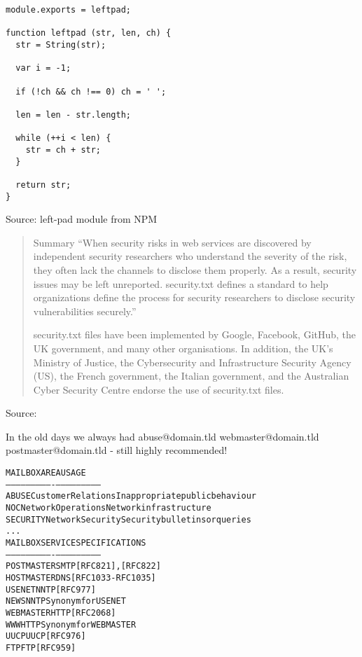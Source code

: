 \documentclass[Screen16to9,17pt]{foils}
\begin{document}


\begin{verbatim}
module.exports = leftpad;

function leftpad (str, len, ch) {
  str = String(str);

  var i = -1;

  if (!ch && ch !== 0) ch = ' ';

  len = len - str.length;

  while (++i < len) {
    str = ch + str;
  }

  return str;
}
\end{verbatim}
Source: left-pad module from NPM




\begin{quote}
Summary
“When security risks in web services are discovered by independent security researchers who understand the severity of the risk, they often lack the channels to disclose them properly. As a result, security issues may be left unreported. security.txt defines a standard to help organizations define the process for security researchers to disclose security vulnerabilities securely.”

security.txt files have been implemented by Google, Facebook, GitHub, the UK government, and many other organisations. In addition, the UK’s Ministry of Justice, the Cybersecurity and Infrastructure Security Agency (US), the French government, the Italian government, and the Australian Cyber Security Centre endorse the use of security.txt files.
\end{quote}

Source: 

\begin{list2}
\item In the old days we always had abuse@domain.tld webmaster@domain.tld postmaster@domain.tld - still highly recommended!
\end{list2}


\begin{alltt}\small
MAILBOX       AREA                USAGE
-----------   ----------------    ---------------------------
ABUSE         Customer Relations  Inappropriate public behaviour
NOC           Network Operations  Network infrastructure
SECURITY      Network Security    Security bulletins or queries
...
MAILBOX       SERVICE             SPECIFICATIONS
-----------   ----------------    ---------------------------
POSTMASTER    SMTP                [RFC821], [RFC822]
HOSTMASTER    DNS                 [RFC1033-RFC1035]
USENET        NNTP                [RFC977]
NEWS          NNTP                Synonym for USENET
WEBMASTER     HTTP                [RFC 2068]
WWW           HTTP                Synonym for WEBMASTER
UUCP          UUCP                [RFC976]
FTP           FTP                 [RFC959]
\end{alltt}
\end{document}
